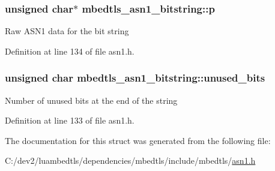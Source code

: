 \hypertarget{structmbedtls__asn1__bitstring_af09328f8b1a8cb5bf4afae369ce3629c}{
\subsubsection[{p}]{\setlength{\rightskip}{0pt plus 5cm}unsigned char$\ast$ mbedtls\-\_\-asn1\-\_\-bitstring\-::p}}\label{structmbedtls__asn1__bitstring_af09328f8b1a8cb5bf4afae369ce3629c}
Raw A\-S\-N1 data for the bit string 

Definition at line 134 of file asn1.\-h.

\hypertarget{structmbedtls__asn1__bitstring_aca26541c9ecb384ef2d5c2ca6a05a25b}{
\subsubsection[{unused\-\_\-bits}]{\setlength{\rightskip}{0pt plus 5cm}unsigned char mbedtls\-\_\-asn1\-\_\-bitstring\-::unused\-\_\-bits}}\label{structmbedtls__asn1__bitstring_aca26541c9ecb384ef2d5c2ca6a05a25b}
Number of unused bits at the end of the string 

Definition at line 133 of file asn1.\-h.



The documentation for this struct was generated from the following file\-:\begin{DoxyCompactItemize}
\item 
C\-:/dev2/luambedtls/dependencies/mbedtls/include/mbedtls/\hyperlink{asn1_8h}{asn1.\-h}\end{DoxyCompactItemize}
